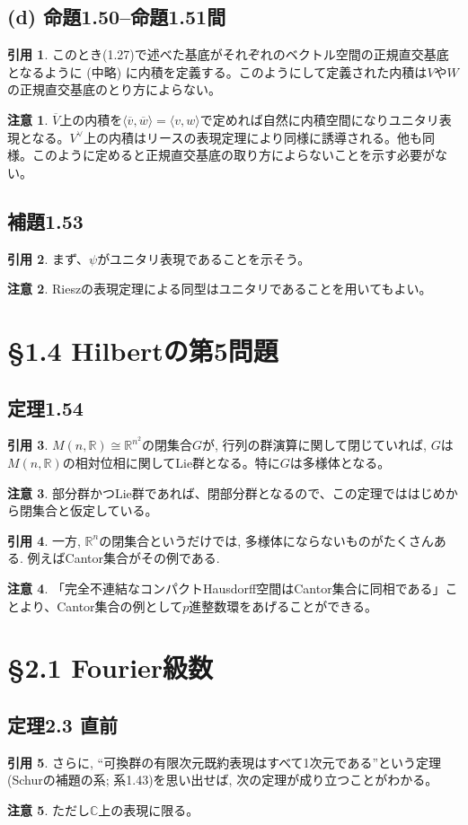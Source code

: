 \documentclass[12pt]{jsarticle}
\newcommand{\R}{\mathbb{R}}
\newcommand{\C}{\mathbb{C}}
\theoremstyle{definition}%
\newtheorem*{rem}{注意}
\newtheorem*{quo}{引用}%
\renewenvironment{leftbar}{%
  \renewcommand\FrameCommand{\vrule width 1pt \hspace{10pt}}%
  \MakeFramed {\advance\hsize-\width \FrameRestore}}%
 {\endMakeFramed}
\newcommand{\barquo}[1]{\begin{leftbar} \begin{quo}  #1 \end{quo} \end{leftbar}}
\newcommand{\bfsubsection}[1]{\subsection*{\textbf{#1}}}
\begin{document}
\bfsubsection{(d) 命題1.50--命題1.51間}
\barquo{
このとき(1.27)で述べた基底がそれぞれのベクトル空間の正規直交基底となるように (中略)
に内積を定義する。このようにして定義された内積は$V$や$W$の正規直交基底のとり方によらない。
}
\begin{rem}
$\overline{V}$上の内積を$\langle \overline{v}, \overline{w} \rangle= \langle v, w \rangle$で定めれば自然に内積空間になりユニタリ表現となる。$V^{\vee}$上の内積はリースの表現定理により同様に誘導される。他も同様。このように定めると正規直交基底の取り方によらないことを示す必要がない。
\end{rem}


\bfsubsection{補題1.53}
\barquo{
まず、$\psi$がユニタリ表現であることを示そう。
}
\begin{rem}
  Rieszの表現定理による同型はユニタリであることを用いてもよい。
\end{rem}


\section*{\S1.4 Hilbertの第5問題}
\bfsubsection{定理1.54}
\barquo{
$M(n,\R) \cong \R^{n^2}$の閉集合$G$が, 行列の群演算に関して閉じていれば, $G$は$M(n,\R)$の相対位相に関してLie群となる。特に$G$は多様体となる。
}
\begin{rem}
部分群かつLie群であれば、閉部分群となるので、この定理でははじめから閉集合と仮定している。
\end{rem}

\barquo{
一方, $\R^n$の閉集合というだけでは, 多様体にならないものがたくさんある. 例えばCantor集合がその例である.
}
\begin{rem}
  「完全不連結なコンパクトHausdorff空間はCantor集合に同相である」ことより、Cantor集合の例として$p$進整数環をあげることができる。
\end{rem}




\section*{\S2.1 Fourier級数}
\bfsubsection{定理2.3 直前}
\barquo{
さらに, ``可換群の有限次元既約表現はすべて1次元である''という定理(Schurの補題の系; 系1.43)を思い出せば, 次の定理が成り立つことがわかる。
}
\begin{rem}
ただし$\C$上の表現に限る。
\end{rem}
\end{document}
